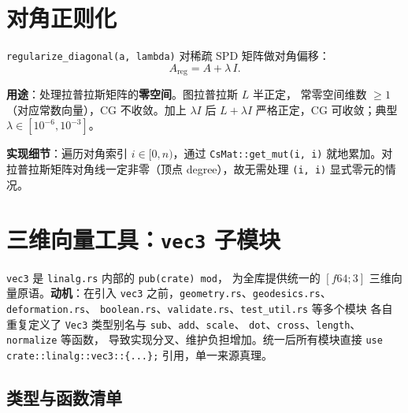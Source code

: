 \documentclass[11pt,a4paper]{article}
\begin{document}
\section{对角正则化}

\texttt{regularize\_diagonal(a, lambda)} 对稀疏 SPD 矩阵做对角偏移：
\[
  A_{\text{reg}} = A + \lambda\, I.
\]

\textbf{用途}：处理拉普拉斯矩阵的\textbf{零空间}。图拉普拉斯 $L$ 半正定，
常零空间维数 $\ge 1$（对应常数向量），CG 不收敛。加上 $\lambda I$ 后
$L + \lambda I$ 严格正定，CG 可收敛；典型 $\lambda \in [10^{-6}, 10^{-3}]$。

\textbf{实现细节}：遍历对角索引 $i \in [0, n)$，通过 \texttt{CsMat::get\_mut(i, i)}
就地累加。对拉普拉斯矩阵对角线一定非零（顶点 degree），故无需处理
\texttt{(i, i)} 显式零元的情况。

\section{三维向量工具：\texttt{vec3} 子模块}

\texttt{vec3} 是 \texttt{linalg.rs} 内部的 \texttt{pub(crate) mod}，
为全库提供统一的 $[f64;3]$ 三维向量原语。\textbf{动机}：在引入 \texttt{vec3}
之前，\texttt{geometry.rs}、\texttt{geodesics.rs}、\texttt{deformation.rs}、
\texttt{boolean.rs}、\texttt{validate.rs}、\texttt{test\_util.rs} 等多个模块
各自重复定义了 \texttt{Vec3} 类型别名与 \texttt{sub}、\texttt{add}、\texttt{scale}、
\texttt{dot}、\texttt{cross}、\texttt{length}、\texttt{normalize} 等函数，
导致实现分叉、维护负担增加。统一后所有模块直接
\texttt{use crate::linalg::vec3::\{...\};} 引用，单一来源真理。

\subsection{类型与函数清单}
\end{document}
